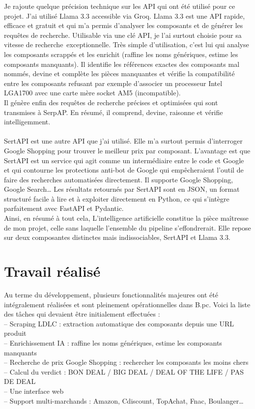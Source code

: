 \documentclass[a4paper, 12pt, twoside]{article}
\begin{document}
Je rajoute quelque précision technique sur les API qui ont été utilisé pour ce projet.
J’ai utilisé Llama 3.3 accessible via Groq. Llama 3.3 est une API rapide, efficace et gratuit et qui m’a permis d'analyser les composants et de générer les requêtes de recherche. Utilisable via une clé API, je l’ai surtout choisie pour sa vitesse de recherche exceptionnelle. Très simple d'utilisation, c'est lui qui analyse les composants scrappés et les enrichit (raffine les noms génériques, estime les composants manquants). Il identifie les références exactes des composants mal nommés, devine et complète les pièces manquantes et vérifie la compatibilité entre les composants refusant par exemple d'associer un processeur Intel LGA1700 avec une carte mère socket AM5 (incompatible). \\
Il génère enfin des requêtes de recherche précises et optimisées qui sont transmises à SerpAP. En résumé, il comprend, devine, raisonne et vérifie intelligemment.\\
\\
SertAPI est une autre API que j'ai utilisé. Elle m’a surtout permis d’interroger Google Shopping pour trouver le meilleur prix par composant. L’avantage est que  SertAPI est un service qui agit comme un intermédiaire entre le code et Google et qui contourne les protections anti-bot de Google qui empêcheraient l’outil de faire des recherches automatisées directement. Il supporte Google Shopping, Google Search… Les résultats retournés par  SertAPI sont en JSON, un format structuré facile à lire et à exploiter directement en Python, ce qui s'intègre parfaitement avec FastAPI et Pydantic.\\

Ainsi, en résumé à tout cela, L'intelligence artificielle constitue la pièce maîtresse de mon projet, celle sans laquelle l'ensemble du pipeline s'effondrerait. Elle repose sur deux composantes distinctes mais indissociables, SertAPI et Llama 3.3.
\newpage





\section{Travail réalisé}
Au terme du développement, plusieurs fonctionnalités majeures ont été intégralement réalisées et sont pleinement opérationnelles dans B.pc. Voici la liste des tâches qui devaient être initialement effectuées :\\
– Scraping LDLC : extraction automatique des composants depuis une URL produit\\
– Enrichissement IA : raffine les noms génériques, estime les composants manquants\\
– Recherche de prix Google Shopping : rechercher les composants les moins chers\\
– Calcul du verdict : BON DEAL / BIG DEAL / DEAL OF THE LIFE / PAS DE DEAL\\
– Une interface web\\
– Support multi-marchands : Amazon, Cdiscount, TopAchat, Fnac, Boulanger…\\
\end{document}

